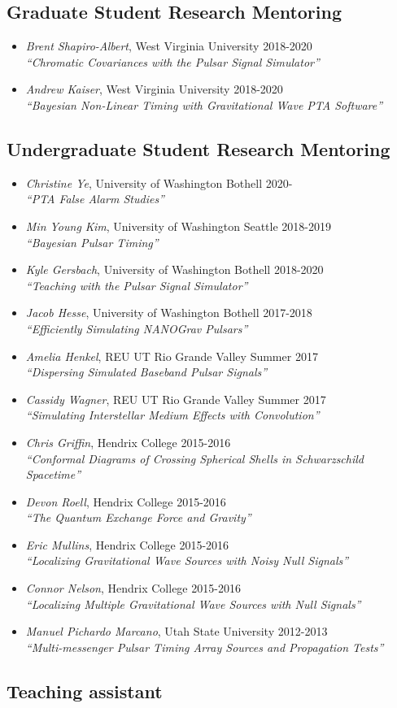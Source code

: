 \documentclass[11pt,letterpaper,sans,unicode]{moderncv}
\newcommand{\studentitem}[4]{\item \textit{#1}, {#2} \hfill{#3} \\ \textit{``#4''} } %
\newcommand{\blucirc}{{\color{color1} $\circ\;\;$}}
\begin{document}
\subsection{Graduate Student Research Mentoring}
\renewcommand\labelitemi{\blucirc}
\begin{itemize}[leftmargin=8mm]
	\studentitem{Brent Shapiro-Albert}{West Virginia University}{2018-2020}{Chromatic Covariances with the Pulsar Signal Simulator}
	\studentitem{Andrew Kaiser}{West Virginia University}{2018-2020}{Bayesian Non-Linear Timing with Gravitational Wave PTA Software}

\end{itemize}


\subsection{Undergraduate Student Research Mentoring}
\renewcommand\labelitemi{\blucirc}
\begin{itemize}[leftmargin=8mm]
	\studentitem{Christine Ye}{University of Washington Bothell}{2020-}{PTA False Alarm Studies}
	\studentitem{Min Young Kim}{University of Washington Seattle}{2018-2019}{Bayesian Pulsar Timing}
	\studentitem{Kyle Gersbach}{University of Washington Bothell}{2018-2020}{Teaching with the Pulsar Signal Simulator}
	\studentitem{Jacob Hesse}{University of Washington Bothell}{2017-2018}{Efficiently Simulating NANOGrav Pulsars}
	\studentitem{Amelia Henkel}{REU UT Rio Grande Valley}{Summer 2017}{Dispersing Simulated Baseband Pulsar Signals}
	\studentitem{Cassidy Wagner}{REU UT Rio Grande Valley}{Summer 2017}{Simulating Interstellar Medium Effects with Convolution}
       	 \studentitem{Chris Griffin}{Hendrix College}{2015-2016}{Conformal Diagrams of Crossing Spherical Shells in Schwarzschild Spacetime}
      	\studentitem{Devon Roell}{Hendrix College}{2015-2016}{The Quantum Exchange Force and Gravity}
	\studentitem{Eric Mullins}{Hendrix College}{2015-2016}{Localizing Gravitational Wave Sources with Noisy Null Signals}
	\studentitem{Connor Nelson}{Hendrix College}{2015-2016}{Localizing Multiple Gravitational Wave Sources with Null Signals}
        	\studentitem{Manuel Pichardo Marcano}{Utah State University}{2012-2013}{Multi-messenger Pulsar Timing Array Sources and Propagation Tests}
\end{itemize}

\subsection{Teaching assistant}
\end{document}
